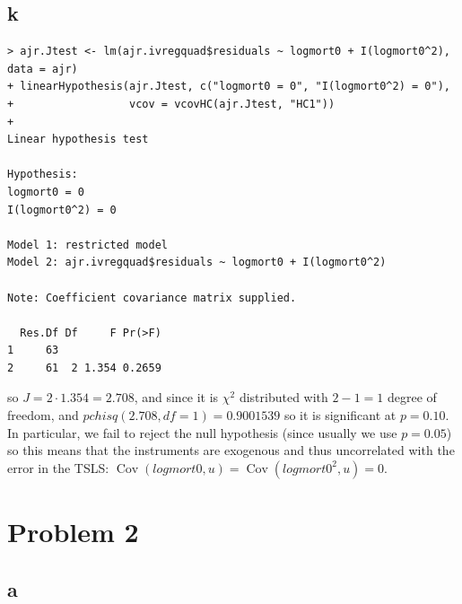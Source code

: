 \documentclass[12pt,letterpaper]{article}
\theoremstyle{definition}
\DeclareMathOperator{\Cov}{Cov}
\begin{document}
\subsection*{k}

\begin{Verbatim}[fontsize=\small]
> ajr.Jtest <- lm(ajr.ivregquad$residuals ~ logmort0 + I(logmort0^2), data = ajr)
+ linearHypothesis(ajr.Jtest, c("logmort0 = 0", "I(logmort0^2) = 0"),
+                  vcov = vcovHC(ajr.Jtest, "HC1"))
+
Linear hypothesis test

Hypothesis:
logmort0 = 0
I(logmort0^2) = 0

Model 1: restricted model
Model 2: ajr.ivregquad$residuals ~ logmort0 + I(logmort0^2)

Note: Coefficient covariance matrix supplied.

  Res.Df Df     F Pr(>F)
1     63
2     61  2 1.354 0.2659
\end{Verbatim}
so $J = 2 \cdot 1.354 = 2.708$, and since it is $\chi^{2}$ distributed with $2- 1 = 1$ degree of freedom, and $pchisq(2.708, df=1) = 0.9001539$ so it is significant at $p = 0.10$. In particular, we fail to reject the null hypothesis (since usually we use $p = 0.05$) so this means that the instruments are exogenous and thus uncorrelated with the error in the TSLS: $\Cov(logmort0, u) = \Cov(logmort0^{2}, u) = 0$.

\section*{Problem 2}
\subsection*{a}
\end{document}
